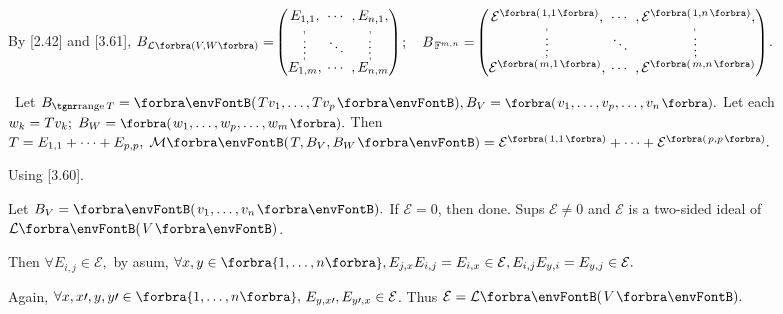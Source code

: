 By [2.42] and [3.61], \;$B_{\Lm[\SmallPar]{V,W}}=${\normalsize${\begin{pmatrix} \underset{\;,}{E_{1,1}}, &\hspace{-6pt} \cdots &\hspace{-6pt} ,\underset{\!,}{E_{n,1}},\\[-2pt] \vdots &\hspace{-6pt} \ddots &\hspace{-6pt} \vdots\\[-2pt] \overset{\;,}{E_{1,m}}, &\hspace{-6pt} \cdots &\hspace{-6pt} ,\overset{\!\!\!,}{E_{n,m}}\end{pmatrix}}$}$;\quad B_{\,{\mathbb{F}}^{m,n}}=${\normalsize$\envFontSmall[\scriptsize]{\begin{pmatrix} \underset{\;,}{\mathcal{E}^{\Par{1,1}}}, &\hspace{-6pt} \cdots &\hspace{-6pt} ,\underset{\!\!,}{\mathcal{E}^{\Par{1,n}}},\\[-2pt] \vdots &\hspace{-6pt} \ddots &\hspace{-6pt} \vdots\\[-2pt]\overset{\;,}{\mathcal{E}^{\Par{m,1}}}, &\hspace{-6pt} \cdots &\hspace{-6pt} ,\overset{\!\!\!,}{\mathcal{E}^{\Par{m,n}}}\end{pmatrix}}$}.\par\vspace{6pt}
\BulletPointX\Tips \,\,\,Let $B_{\range T}=\Par{Tv_1,\dots,Tv_p},B_V=\BigPar{v_1,\dots,v_p,\dots,v_n}.$ Let each $w_k=Tv_k;\;B_W=\BigPar{w_1,\dots,w_p,\dots,w_m}.$\TextB{\vspace{2pt}}\IndentTips{}
Then $T=E_{1,1}+\dots+E_{p,p},\;\Mt{T,B_V,B_W}=\mathcal{E}^{\SmallPar[1pt]{1,1}}+\dots+\mathcal{E}^{\SmallPar[1pt]{p,p}}.$\vspace{-4pt}
\SepLine

 \;Using {\NOTEFOR} [3.60].\par\quad
Let $B_V=\Par{v_1,\dots,v_n}.$ If $\mathcal{E}=0$, then done. Sups $\mathcal{E}\neq 0$ and $\mathcal{E}$ is a two-sided ideal of $\Lm{V}$.\vspace{3pt}\par\quad
Then {\FontLarge$\forall E_{i,j}\in\mathcal{E},$} by asum, {\FontLarge\vspace{3pt}$\forall x,y\in\Bra{1,\dots,n},E_{j,x}E_{i,j}=E_{i,x}\in\mathcal{E},E_{i,j}E_{y,i}=E_{y,j}\in\mathcal{E}.$}\par\quad
Again, $\forall x,x\apostrophe,y,y\apostrophe\in\Bra{1,\dots,n},$\;\,{\FontLarge$E_{y,x\prime},E_{y\prime,x}\in\mathcal{E}$}. Thus $\mathcal{E}=\Lm{V}.$\PfEnd
\SepLine


